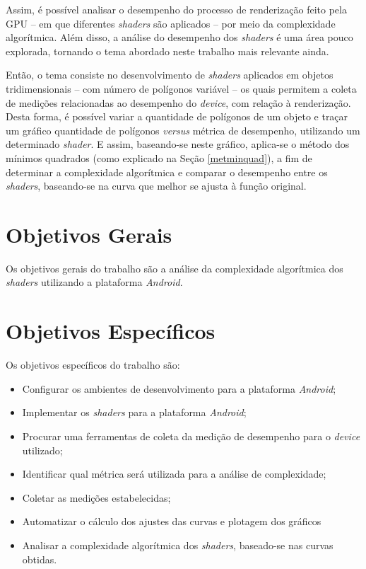 	Assim, é possível analisar o desempenho do processo de renderização feito pela GPU -- em que diferentes \textit{shaders} são aplicados -- por meio da complexidade algorítmica. Além disso, a análise do desempenho dos \textit{shaders} é uma área pouco explorada, tornando o tema abordado neste trabalho mais relevante ainda. 

	Então, o tema consiste no desenvolvimento de \textit{shaders} aplicados em objetos tridimensionais -- com número de polígonos variável -- os quais permitem a coleta de medições relacionadas ao desempenho do \textit{device}, com relação à renderização. Desta forma, é possível variar a quantidade de polígonos de um objeto e traçar um gráfico quantidade de polígonos \textit{versus} métrica de desempenho, utilizando um determinado \textit{shader}. E assim, baseando-se neste gráfico, aplica-se o método dos mínimos quadrados (como explicado na Seção \ref{metminquad}), a fim de determinar a complexidade algorítmica e comparar o desempenho entre os \textit{shaders}, baseando-se na curva que melhor se ajusta à função original.  

\section{Objetivos Gerais}

Os objetivos gerais do trabalho são a análise da complexidade algorítmica dos \textit{shaders} utilizando a plataforma \textit{Android}.

\section{Objetivos Específicos}

Os objetivos específicos do trabalho são:

\begin{itemize}
 \item Configurar os ambientes de desenvolvimento para a plataforma \textit{Android};
 \item Implementar os \textit{shaders} para a plataforma \textit{Android};
\item Procurar uma ferramentas de coleta da medição de desempenho para o \textit{device} utilizado;
\item Identificar qual métrica será utilizada para a análise de complexidade;
\item Coletar as medições estabelecidas;
\item Automatizar o cálculo dos ajustes das curvas e plotagem dos gráficos
\item Analisar a complexidade algorítmica dos \textit{shaders}, baseado-se nas curvas obtidas.
\end{itemize}

